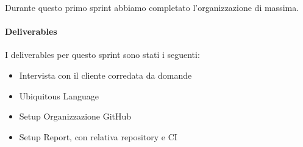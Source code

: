 Durante questo primo sprint abbiamo completato l'organizzazione di massima.
\paragraph{Deliverables} 
I deliverables per questo sprint sono stati i seguenti:
\begin{itemize}
    \item Intervista con il cliente corredata da domande
    \item Ubiquitous Language
    \item Setup Organizzazione GitHub
    \item Setup Report, con relativa repository e CI
\end{itemize}
